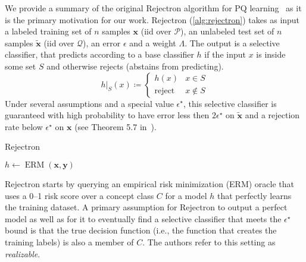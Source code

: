 We provide a summary of the original Rejectron algorithm for PQ learning~\citep{pqlearn} as it is the primary motivation for our work.
Rejectron (\autoref{alg:rejectron}) takes as input a labeled training set of $n$ samples $\mathbf{x}$ (iid over $\mathcal{P}$), an unlabeled test set of $n$ samples $\tilde{\mathbf{x}}$ (iid over $\mathcal{Q}$), an error $\epsilon$ and a weight $\Lambda$.
The output is a selective classifier, that predicts according to a base classifier $h$ if the input $x$ is inside some set $S$ and otherwise rejects (abstains from predicting).
\begin{equation}
    \left. h\right|_{S}(x) \coloneqq \begin{cases}
                                         h(x) & x\in S \\
                                         \text{reject} & x\not\in S
    \end{cases}
    \label{eq:selective_classifier}
\end{equation}
Under several assumptions and a special value $\epsilon^\star$, this selective classifier is guaranteed with high probability to have error less then $2 \epsilon^\star$ on $\tilde{\mathbf{x}}$
and a rejection rate below $\epsilon^\star$ on ${\mathbf{x}}$ (see Theorem 5.7 in~\citeauthor{pqlearn}).

\begin{algorithm}
    \caption{Rejectron~\citep{pqlearn}}
    \label{alg:rejectron}
    $h\gets \operatorname{ERM}(\mathbf{x}, \mathbf{y})$ 
\end{algorithm}
Rejectron starts by querying an empirical risk minimization (ERM) oracle that uses a 0--1 risk score over a concept class $C$ for a model $h$ that perfectly learns the training dataset.
A primary assumption for Rejectron to output a perfect model as well as for it to eventually find a selective classifier that meets the $\epsilon^\star$ bound is that the true decision function
(i.e., the function that creates the training labels) is also a member of $C$.
The authors refer to this setting as \textit{realizable}.

